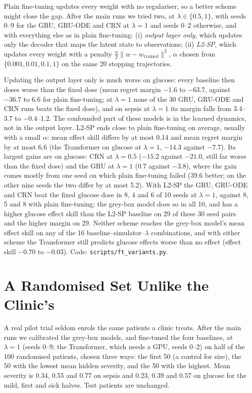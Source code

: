 \documentclass[letterpaper]{article}
\begin{document}
Plain fine-tuning updates every weight with no regulariser, so a better scheme might close the gap. After the main runs we tried two, at $\lambda\in\{0.5,1\}$, with seeds 0--9 for the GRU, GRU-ODE and CRN at $\lambda=1$ and seeds 0--2 otherwise, and with everything else as in plain fine-tuning: (i) \emph{output layer only}, which updates only the decoder that maps the latent state to observations; (ii) \emph{L2-SP}, which updates every weight with a penalty $\tfrac{\alpha}{2}\lVert w-w_{\mathrm{trained}}\rVert^2$, $\alpha$ chosen from $\{0.001,0.01,0.1,1\}$ on the same 20 stopping trajectories.

Updating the output layer only is much worse on glucose: every baseline then doses worse than the fixed dose (mean regret margin $-1.6$ to $-63.7$, against $-36.7$ to $6.6$ for plain fine-tuning; at $\lambda=1$ none of the 30 GRU, GRU-ODE and CRN runs beats the fixed dose), and on sepsis at $\lambda=1$ its margin falls from 3.4--3.7 to $-0.4$--1.2. The confounded part of these models is in the learned dynamics, not in the output layer. L2-SP ends close to plain fine-tuning on average, usually with a small $\alpha$: mean effect skill differs by at most 0.14 and mean regret margin by at most 6.6 (the Transformer on glucose at $\lambda=1$, $-14.3$ against $-7.7$). Its largest gains are on glucose: CRN at $\lambda=0.5$ ($-15.2$ against $-21.0$, still far worse than the fixed dose) and the GRU at $\lambda=1$ (0.7 against $-3.8$), where the gain comes mostly from one seed on which plain fine-tuning failed (39.6 better; on the other nine seeds the two differ by at most 5.2). With L2-SP the GRU, GRU-ODE and CRN beat the fixed glucose dose in 8, 4 and 6 of 10 seeds at $\lambda=1$, against 8, 5 and 8 with plain fine-tuning; the grey-box model does so in all 10, and has a higher glucose effect skill than the L2-SP baseline on 29 of these 30 seed pairs and the higher margin on 29. Neither scheme reaches the grey-box model's mean effect skill on any of the 16 baseline--simulator--$\lambda$ combinations, and with either scheme the Transformer still predicts glucose effects worse than no effect (effect skill $-0.70$ to $-0.03$). Code: \texttt{scripts/ft\_variants.py}.

\section{A Randomised Set Unlike the Clinic's}
\label{sec:shift}

A real pilot trial seldom enrols the same patients a clinic treats. After the main runs we calibrated the grey-box models, and fine-tuned the four baselines, at $\lambda=1$ (seeds 0--9; the Transformer, which needs a GPU, seeds 0--2) on half of the 100 randomised patients, chosen three ways: the first 50 (a control for size), the 50 with the lowest mean hidden severity, and the 50 with the highest. Mean severity is 0.34, 0.55 and 0.77 on sepsis and 0.23, 0.39 and 0.57 on glucose for the mild, first and sick halves. Test patients are unchanged.
\end{document}
